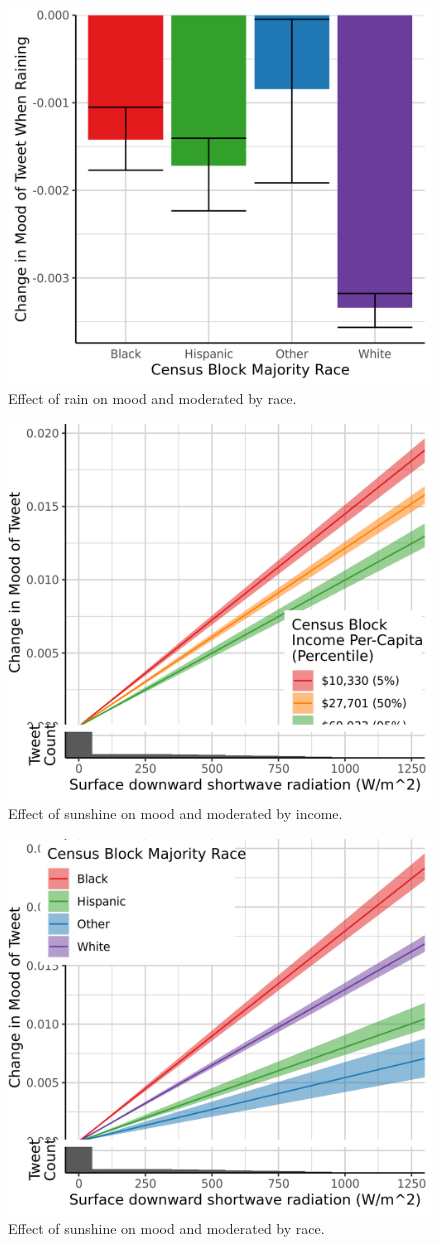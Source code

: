 \documentclass{article}
\begin{document}
\begin{figure}[H]
  \centering
  \includegraphics[width=0.6\linewidth]{../res/raining-race_q.png}
  \caption{Effect of rain on mood and moderated by race.}
  \label{fig:timeseries}
\end{figure}


\begin{figure}[H]
  \centering
  \includegraphics[width=0.6\linewidth]{../res/srad-income.png}
  \caption{Effect of sunshine on mood and moderated by income.}
  \label{fig:timeseries}
\end{figure}

\begin{figure}[H]
  \centering
  \includegraphics[width=0.6\linewidth]{../res/srad-race_q.png}
  \caption{Effect of sunshine on mood and moderated by race.}
  \label{fig:timeseries}
\end{figure}
\end{document}
